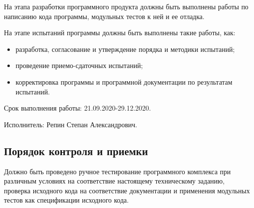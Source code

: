 На этапа разработки программного продукта должны быть выполнены работы по
написанию кода программы, модульных тестов к ней и ее отладка.

На этапе испытаний программы должны быть выполнены такие работы, как:
\begin{itemize}
    \item разработка, согласование и утверждение порядка и методики испытаний;
    \item проведение приемо-сдаточных испытаний;
    \item корректировка программы и программной документации по результатам
        испытаний.
\end{itemize}

Срок выполнения работы: 21.09.2020-29.12.2020.

Исполнитель: Репин Степан Александрович.

\subsection{Порядок контроля и приемки}

Должно быть проведено ручное тестирование программного комплекса при различным
условиях на соответствие настоящему техническому заданию, проверка исходного
кода на соответствие документации и применения модульных тестов как
спецификации исходного кода.



\clearpage

